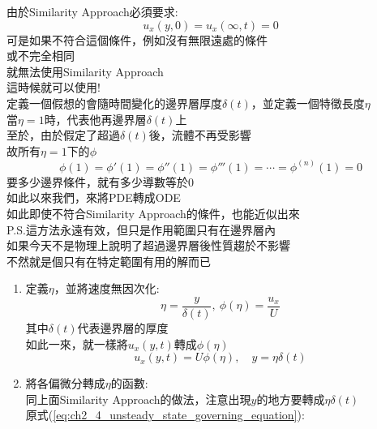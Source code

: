 \documentclass[../main.tex]{subfiles}
\begin{document}
\begin{itemize}
\begin{enumerate}
\begin{itemize}
      由於Similarity Approach必須要求:
      \begin{equation}
        u_x(y,0) = u_x(\infty, t) = 0
      \end{equation}
      可是如果不符合這個條件，例如沒有無限遠處的條件\\
      或不完全相同\\
      就無法使用Similarity Approach\\
      這時候就可以使用!\\
      定義一個假想的會隨時間變化的邊界層厚度$\delta(t)$，並定義一個特徵長度$\eta$\\
      當$\eta=1$時，代表他再邊界層$\delta(t)$上\\
      至於，由於假定了超過$\delta(t)$後，流體不再受影響\\
      故所有$\eta =1$下的$\phi$
      \begin{equation}
        \boxed{\phi(1) = \phi'(1) = \phi''(1) = \phi'''(1) = \cdots = \phi^{(n)}(1) = 0}
      \end{equation}
      要多少邊界條件，就有多少導數等於0\\
      如此以來我們，來將PDE轉成ODE\\
      如此即使不符合Similarity Approach的條件，也能近似出來\\
      P.S.這方法永遠有效，但只是作用範圍只有在邊界層內\\
      如果今天不是物理上說明了超過邊界層後性質趨於不影響\\
      不然就是個只有在特定範圍有用的解而已
      \begin{enumerate}
        \item 定義$\eta$，並將速度無因次化:
        \begin{equation}
          \eta = \frac{y}{\delta(t)},~\phi(\eta) = \frac{u_x}{U}
        \end{equation}
        其中$\delta(t)$代表邊界層的厚度\\
        如此一來，就一樣將$u_x(y,t)$轉成$\phi(\eta)$
        \begin{equation}
          u_x(y,t) = U \phi(\eta), \quad y = \eta \delta(t)
        \end{equation}
        \item 將各偏微分轉成$\eta$的函數:\\
        同上面Similarity Approach的做法，注意出現$y$的地方要轉成$\eta \delta(t)$\\
        原式(\ref{eq:ch2_4_unsteady_state_governing_equation}):

\end{enumerate}
\end{itemize}
\end{enumerate}
\end{itemize}
\end{document}
